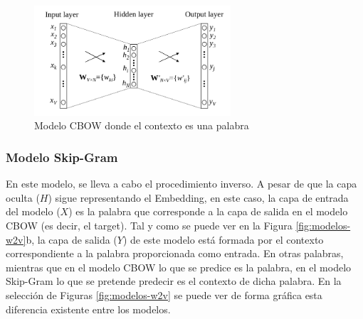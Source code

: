     
\begin{figure}[H]
    \centering
    \includegraphics[width=0.65\textwidth]{imagenes/cbow_esquema.png}
    \caption{Modelo CBOW donde el contexto es una palabra~\cite{rong2014word2vec}}
  \label{fig:cbow-1}
\end{figure}
    
\subsubsection{Modelo Skip-Gram}
En este modelo, se lleva a cabo el procedimiento inverso. A pesar de que la capa oculta ($H$) sigue representando el Embedding, en este caso, la capa de entrada del modelo ($X$) es la palabra que corresponde a la capa de salida en el modelo CBOW (es decir, el target). Tal y como se puede ver en la Figura \ref{fig:modelos-w2v}b, la capa de salida ($Y$) de este modelo está formada por el contexto correspondiente a la palabra proporcionada como entrada. En otras palabras, mientras que en el modelo CBOW lo que se predice es la palabra, en el modelo Skip-Gram lo que se pretende predecir es el contexto de dicha palabra. En la selección de Figuras \ref{fig:modelos-w2v} se puede ver de forma gráfica esta diferencia existente entre los modelos. 

